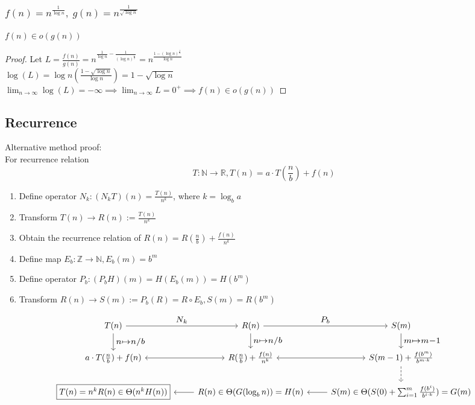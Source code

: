 \documentclass[9pt]{extarticle}
\begin{document}
\subsubsection{$f(n) = n^{\frac{1}{\log n}},\; g(n) = n^{\frac{1}{\sqrt{\log n}}}$}
$f(n) \in o(g(n))$
\begin{proof}
    Let $L = \frac{f(n)}{g(n)} = n^{\frac{1}{\log n} - \frac{1}{(\log n)^\frac{1}{2}}} = n^{\frac{1-(\log n)^{\frac{1}{2}}}{\log n}}$\\
    $\log(L) = \log n (\frac{1-\sqrt{\log n}}{\log n}) = 1-\sqrt{\log n} $\\
    $\lim_{n \rightarrow \infty} \log(L) = -\infty \implies \lim_{n \rightarrow \infty} L = 0^+ \implies f(n) \in o(g(n))$
\end{proof}

\subsection*{Recurrence}
Alternative method proof: \\
For recurrence relation 
\[T: \mathbb{N} \rightarrow \mathbb{R},T(n) = a\cdot T(\frac{n}{b}) + f(n)\]
\begin{enumerate}
    \item Define operator $N_k: (N_kT)(n) = \frac{T(n)}{n^k}$, where $k = \log_ba$
    \item Transform $T(n) \rightarrow R(n) := \frac{T(n)}{n^k}$
    \item Obtain the recurrence relation of $R(n) = R(\frac{n}{b}) + \frac{f(n)}{n^k}$
    \item Define map $E_b: \mathbb{Z} \rightarrow \mathbb{N}, E_b(m) = b^m$
    \item Define operator $P_b: (P_b H)(m) = H(E_b(m)) = H(b^m)$
    \item Transform $R(n) \rightarrow S(m) := P_b(R) = R \circ E_b, S(m) = R(b^m)$
\end{enumerate} 
\[
\begin{tikzcd}[scale=1.35, transform shape]
T(n) \arrow[r, "N_k"] \arrow[d, "n \mapsto n/b"] & R(n) \arrow[r, "P_b"] \arrow[d,"n \mapsto n/b"]& S(m) \arrow[d, "m \mapsto m-1"]\\
a\cdot T(\frac{n}{b}) + f(n) \arrow[r, <->] & R(\frac{n}{b}) + \frac{f(n)}{n^k} \arrow[r, <->]& S(m - 1) + \frac{f(b^m)}{b^{m\cdot k}} \arrow[d, dashed,""]\\
\fbox{$T(n) = n^kR(n)\in \Theta(n^k H(n))$} &\arrow[l] R(n) \in \Theta(G(\log_bn)) = H(n) &\arrow[l] S(m) \in \Theta(S(0) + \sum_{i=1}^{m}\frac{f(b^i)}{b^{i\cdot k}}) = G(m)
\end{tikzcd}  
\]
\end{document}
